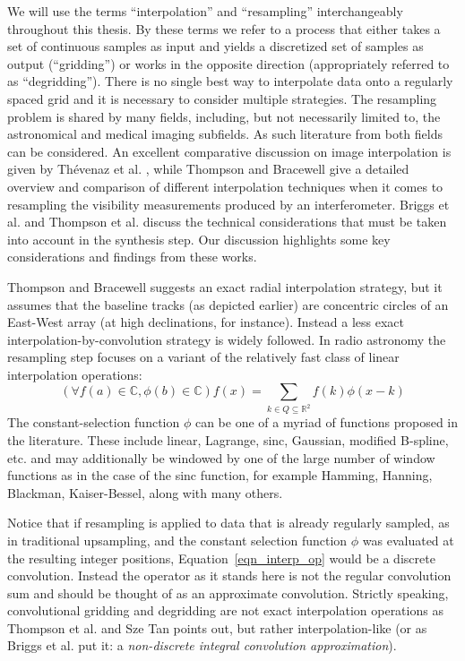  We will use the terms ``interpolation'' and ``resampling'' interchangeably throughout this thesis. By these terms we refer to a process that 
 either takes a set of continuous samples as input and yields a discretized set of samples as output (``gridding'') or works in the opposite 
 direction (appropriately referred to as ``degridding''). There is no single best way to interpolate data onto a regularly spaced grid 
 and it is necessary to consider multiple strategies. The resampling problem is shared by many fields, including, 
 but not necessarily limited to, the astronomical and medical imaging subfields. As such literature from both fields can be considered. An 
 excellent comparative discussion on image interpolation is given by Th\'evenaz et al. \cite{thevenaz2000image}, while
 Thompson and Bracewell \cite{thompson1974interpolation} give a detailed overview and comparison of different interpolation techniques when it comes to 
 resampling the visibility measurements produced by an interferometer. Briggs et al. \cite[Lecture 7]{taylor1999synthesis} and 
 Thompson et al. \cite[p. 387-399]{thompson2008interferometry} discuss the technical considerations that must be taken into 
 account in the synthesis step. Our discussion highlights some key considerations and findings from these works.
 
 Thompson and Bracewell \cite{thompson1974interpolation} suggests an exact radial interpolation strategy, but it assumes
 that the baseline tracks (as depicted earlier) are concentric circles of an East-West array (at high declinations, for instance). Instead a 
 less exact interpolation-by-convolution strategy is widely followed. In radio astronomy the resampling step focuses on a 
 variant of the relatively fast class of linear interpolation operations:
 \begin{equation}
   \label{eqn_interp_op}
   (\forall f(a)\in\mathbb{C},\phi(b)\in\mathbb{C})f(x) = \sum_{k\in Q\subseteq\mathbb{R}^2}{f(k)\phi(x-k)}
 \end{equation}
 The constant-selection function $\phi$ can be one of a myriad of functions proposed in the literature. These include linear, Lagrange, sinc, 
 Gaussian, modified B-spline, etc. and may additionally be windowed by one of the large number of window functions as in the case of the sinc function, 
 for example Hamming, Hanning, Blackman, Kaiser-Bessel, along with many others.
 
 Notice that if resampling is applied to data that is already regularly sampled, as in traditional upsampling, and the constant 
 selection function $\phi$ was evaluated at the resulting integer positions, Equation~\ref{eqn_interp_op} would be a discrete convolution. Instead the 
 operator as it stands here is not the regular convolution sum and should be thought of as an approximate convolution. 
 Strictly speaking, convolutional gridding and degridding are not exact interpolation operations as Thompson et al. \cite{thompson2008interferometry} and 
 Sze Tan \cite{tan1986aperture} points out, but rather interpolation-like (or as Briggs et al. \cite[Lecture 7]{taylor1999synthesis} put 
 it: a \emph{non-discrete integral convolution approximation}).
 
